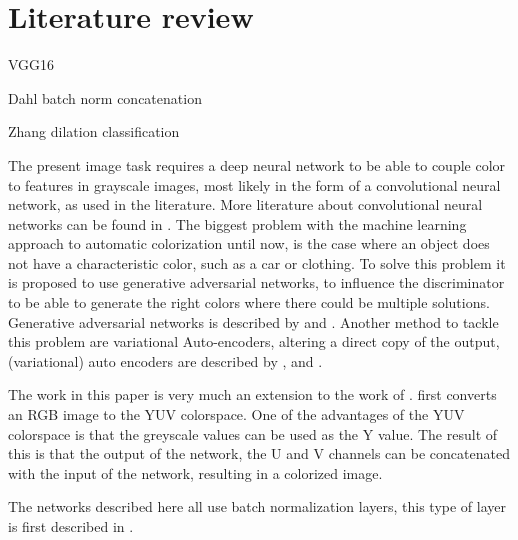 \section{Literature review}

VGG16




Dahl
batch norm
concatenation




Zhang
dilation
classification



The present image task requires a deep neural network to be able to couple color to features in grayscale images, most likely in the form of a convolutional neural network, as used in the literature. More literature about convolutional neural networks can be found in \cite{GoodfellowBOOK}. The biggest problem with the machine learning approach to automatic colorization until now, is the case where an object does not have a characteristic color, such as a car or clothing. To solve this problem it is proposed to use generative adversarial networks, to influence the discriminator to be able to generate the right colors where there could be multiple solutions. Generative adversarial networks is described by \cite{Goodfellow} and \cite{Radford}. Another method to tackle this problem are variational Auto-encoders, altering a direct copy of the output, (variational) auto encoders are described by \cite{Gregor}, \cite{Kingma} and \cite{GoodfellowBOOK}.

The work in this paper is very much an extension to the work of \cite{Dahl}. \cite{Dahl} first converts an RGB image to the YUV colorspace. One of the advantages of the YUV colorspace is that the greyscale values can be used as the Y value. The result of this is that the output of the network, the U and V channels can be concatenated with the input of the network, resulting in a colorized image.






The networks described here all use batch normalization layers, this type of layer is first described in \cite{ioffe2015batch}. 





